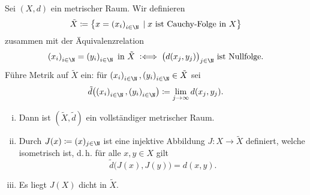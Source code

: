 \begin{thEmpty}[Vervollständigung] \label{vl04:2.18:Vervollstaendigung}
    Sei $(X,d)$ ein metrischer Raum. Wir definieren 
    \[  \tilde X \defeq 
        \bigl\{ x = \iSeq x \Mid x \text{ ist Cauchy-Folge in $X$} \bigr\}
    \]
    zusammen mit der Äquivalenzrelation
    \[ \iSeq x = \iSeq y \text{ in $\tilde X$} \;\defiff\; \bigl( d(x_j,y_j)
        \bigr)_{j\in\N} \text{ ist Nullfolge}
    . \]
    Führe Metrik auf $\tilde X$ ein: für $\iSeq x,\iSeq y\in\tilde X$ sei
    \[ \tilde d\bigl( \iSeq x, \iSeq y \bigr) \defeq
        \lim_{j\to\infty} d(x_j,y_j)
    . \]
    
    \nnSatz
    \begin{enumerate}[i)]
        \item \label{vl04:satz2.18-i}
            Dann ist $(\tilde X,\tilde d)$ ein vollständiger metrischer Raum.
        \item \label{vl04:satz2.18-ii}
            Durch $J(x) \defeq (x)_{j\in\N}$ ist eine injektive Abbildung
            $J\colon X\to\tilde X$ definiert, welche isometrisch ist, d.\,h.
            für alle $x,y\in X$ gilt
            \[ \tilde d\bigl( J(x), J(y) \bigr) = d(x,y) . \]
        \item \label{vl04:satz2.18-iii}
            Es liegt $J(X)$ dicht in $\tilde X$.
    \end{enumerate}
\end{thEmpty}

